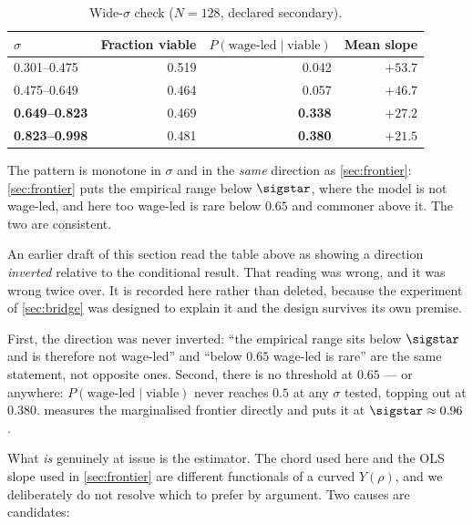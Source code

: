 \begin{table}[htbp]
\centering
\small
\caption{Wide-$\sigma$ check ($N = 128$, declared secondary).}
\label{tab:widesigma}
\begin{tabular}{lrrr}
\toprule
$\sigma$ & Fraction viable & $P(\text{wage-led} \mid \text{viable})$
& Mean slope\\
\midrule
0.301--0.475 & 0.519 & 0.042 & $+53.7$\\
0.475--0.649 & 0.464 & 0.057 & $+46.7$\\
\textbf{0.649--0.823} & 0.469 & \textbf{0.338} & $+27.2$\\
\textbf{0.823--0.998} & 0.481 & \textbf{0.380} & $+21.5$\\
\bottomrule
\end{tabular}
\end{table}

The pattern is monotone in $\sigma$ and in the \emph{same} direction as
\cref{sec:frontier}: \cref{sec:frontier} puts the empirical range below
$\sigstar$, where the model is not wage-led, and here too wage-led is rare
below $0.65$ and commoner above it. The two are consistent.

\begin{declbox}[frametitle={A reading error, corrected in the next section}]
An earlier draft of this section read the table above as showing a direction
\emph{inverted} relative to the conditional result. That reading was wrong, and
it was wrong twice over. It is recorded here rather than deleted, because the
experiment of \cref{sec:bridge} was designed to explain it and the design
survives its own premise.

First, the direction was never inverted: ``the empirical range sits below
$\sigstar$ and is therefore not wage-led'' and ``below $0.65$ wage-led is rare''
are the same statement, not opposite ones. Second, there is no threshold at
$0.65$ --- or anywhere: $P(\text{wage-led} \mid \text{viable})$ never reaches
$0.5$ at any $\sigma$ tested, topping out at $0.380$.  measures
the marginalised frontier directly and puts it at $\sigstar \approx 0.96$.
\end{declbox}

What \emph{is} genuinely at issue is the estimator. The chord used here and the
OLS slope used in \cref{sec:frontier} are different functionals of a curved
$Y(\rho)$, and we deliberately do not resolve which to prefer by argument. Two
causes are candidates:

